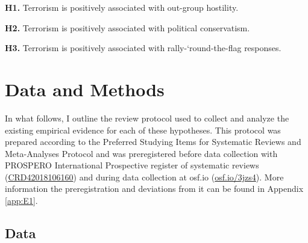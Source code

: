 \vspace{2mm}
\noindent\textbf{H1.} Terrorism is positively associated with {out-group hostility.}

\vspace{2mm}
\noindent\textbf{H2.} Terrorism is positively associated with {political conservatism.}

\vspace{2mm}
\noindent\textbf{H3.} Terrorism is positively associated with {rally-‘round-the-flag} responses.



\section{Data and Methods}
In what follows, I outline the review protocol used to collect and analyze the existing empirical evidence for each of these hypotheses. This protocol was prepared according to the Preferred Studying Items for Systematic Reviews and Meta-Analyses Protocol \citep[PRISMA-P;][]{Shamseer2015} and was preregistered before data collection with PROSPERO International Prospective register of systematic reviews (\href{https://www.crd.york.ac.uk/prospero/display_record.php?RecordID=106160}{CRD42018106160}) and during data collection at osf.io (\href{https://www.osf.io/3jzs4}{osf.io/3jzs4}). More information the preregistration and deviations from it can be found in Appendix \ref{app:E1}.

\label{sec:53}
\subsection{Data}
